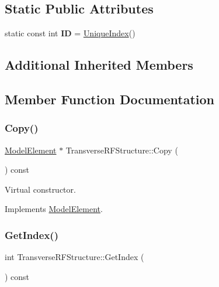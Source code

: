 \subsection*{Static Public Attributes}
\begin{DoxyCompactItemize}
\item 
\mbox{\label{classTransverseRFStructure_a8626c8088b860131155e8690f2560b28}} 
static const int {\bfseries ID} = \hyperlink{classAcceleratorComponent_aa7ad4d39e1a488b705983842ed1ac784}{Unique\+Index}()
\end{DoxyCompactItemize}
\subsection*{Additional Inherited Members}


\subsection{Member Function Documentation}
\mbox{\label{classTransverseRFStructure_a834a1ab102f7173c459a4e801f28e25b}} 
\subsubsection{\texorpdfstring{Copy()}{Copy()}}
{\footnotesize\ttfamily \hyperlink{classModelElement}{Model\+Element} $\ast$ Transverse\+R\+F\+Structure\+::\+Copy (\begin{DoxyParamCaption}{ }\end{DoxyParamCaption}) const\hspace{0.3cm}{\ttfamily [virtual]}}

Virtual constructor. 

Implements \hyperlink{classModelElement_ac3ca26d649bd86a0f31a58ae09941429}{Model\+Element}.

\mbox{\label{classTransverseRFStructure_ab19fe781495285c2b088da81fe3ccff0}} 
\subsubsection{\texorpdfstring{Get\+Index()}{GetIndex()}}
{\footnotesize\ttfamily int Transverse\+R\+F\+Structure\+::\+Get\+Index (\begin{DoxyParamCaption}{ }\end{DoxyParamCaption}) const\hspace{0.3cm}{\ttfamily [virtual]}}

